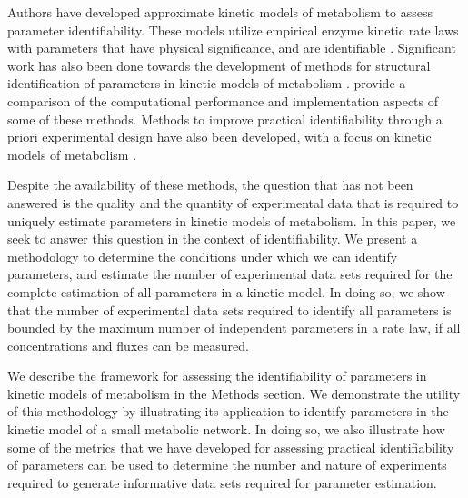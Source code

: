 \documentclass[10pt]{article}
\begin{document}
	
	Authors have developed approximate kinetic models of metabolism to assess parameter identifiability. These models utilize empirical enzyme kinetic rate laws with parameters that have physical significance, and are identifiable \parencite{Heijnen2005,Smallbone2007}. Significant work has also been done towards the development of methods for structural identification of parameters in kinetic models of metabolism \parencite{Nikerel2009,Berthoumieux2013,Raue2014}. \textcite{Chis2011b} provide a comparison of the computational performance and implementation aspects of some of these methods. 	
	Methods to improve practical identifiability through a priori experimental design have also been developed, with a focus on kinetic models of metabolism \parencite{Gadkar2005a,Rodriguez-Fernandez2006,Vanlier2014a,Raue2014}. 
	
	Despite the availability of these methods, the question that has not been answered is the quality and the quantity of experimental data that is required to uniquely estimate parameters in kinetic models of metabolism. In this paper, we seek to answer this question in the context of identifiability. We present a methodology to determine the conditions under which we can identify parameters, and estimate the number of experimental data sets required for the complete estimation of all parameters in a kinetic model. In doing so, we show that the number of experimental data sets required to identify all parameters is bounded by the maximum number of independent parameters in a rate law, if all concentrations and fluxes can be measured. 
	
	We describe the framework for assessing the identifiability of parameters in kinetic models of metabolism in the Methods section. We demonstrate the utility of this methodology by illustrating its application to identify parameters in the kinetic model of a small metabolic network. In doing so, we also illustrate how some of the metrics that we have developed for assessing practical identifiability of parameters can be used to determine the number and nature of experiments required to generate informative data sets required for parameter estimation.  
	
\end{document}
